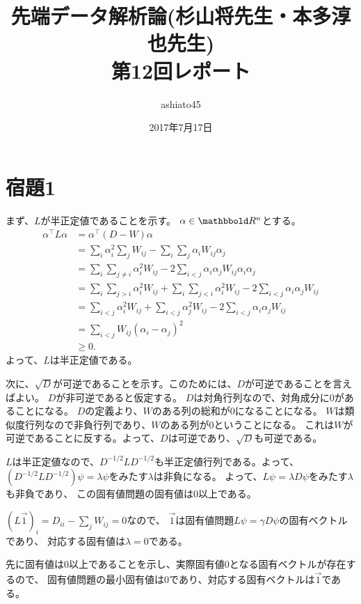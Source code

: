 \documentclass[9pt]{ltjsarticle}
\title{先端データ解析論(杉山将先生・本多淳也先生)\\第12回レポート}
\author{ashiato45}
\date{2017年7月17日}
\begin{document}
\maketitle

\section*{宿題1}
まず、$L$が半正定値であることを示す。
$\alpha \in \R^n$とする。
\begin{align}
\alpha^\top L \alpha
&=
\alpha^\top (D-W)\alpha\\
&=
\sum_i \alpha_i^2 \sum_j W_{ij} - \sum_i\sum_j \alpha_i W_{ij}\alpha_j\\
&=
\sum_i\sum_{j\neq i} \alpha_i^2 W_{ij}
-2 \sum_{i<j}\alpha_i\alpha_j W_{ij}\alpha_i\alpha_j\\
&=
\sum_i \sum_{j>i}\alpha_i^2 W_{ij} + \sum_i\sum_{j<i}\alpha_i^2W_{ij}
-2\sum_{i<j}\alpha_i\alpha_jW_{ij}\\
&=
\sum_{i<j}\alpha_i^2W_{ij} + \sum_{i<j}\alpha_j^2 W_{ij} - 2\sum_{i<j}\alpha_i\alpha_jW_{ij}\\
&=
\sum_{i<j}W_{ij}(\alpha_i-\alpha_j)^2\\
&\ge 0.
\end{align}
よって、$L$は半正定値である。

次に、$\sqrt{D}$が可逆であることを示す。このためには、$D$が可逆であることを言えばよい。
$D$が非可逆であると仮定する。
$D$は対角行列なので、対角成分に$0$があることになる。
$D$の定義より、$W$のある列の総和が$0$になることになる。
$W$は類似度行列なので非負行列であり、$W$のある列が$0$ということになる。
これは$W$が可逆であることに反する。よって、$D$は可逆であり、$\sqrt{D}$も可逆である。

$L$は半正定値なので、$D^{-1/2}LD^{-1/2}$も半正定値行列である。よって、
$(D^{-1/2}LD^{-1/2})\psi = \lambda\psi$をみたす$\lambda$は非負になる。
よって、$L\psi = \lambda D\psi$をみたす$\lambda$も非負であり、
この固有値問題の固有値は0以上である。

$(L\vec 1)_i = D_{ii} - \sum_j W_{ij} = 0$なので、
$\vec 1$は固有値問題$L\psi = \gamma D\psi$の固有ベクトルであり、
対応する固有値は$\lambda=0$である。

先に固有値は0以上であることを示し、実際固有値0となる固有ベクトルが存在するので、
固有値問題の最小固有値は0であり、対応する固有ベクトルは$\vec 1$である。

\end{document}

